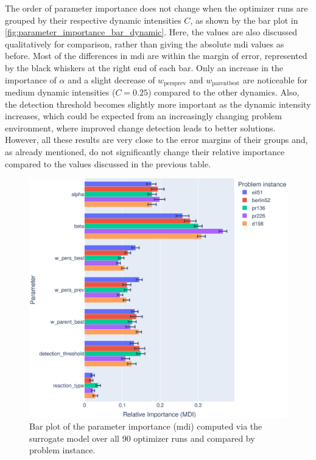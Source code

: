 The order of parameter importance does not change when the optimizer runs are grouped by their respective dynamic intensities $C$, as shown by the bar plot in \cref{fig:parameter_importance_bar_dynamic}. Here, the values are also discussed qualitatively for comparison, rather than giving the absolute \gls{mdi} values as before. Most of the differences in \gls{mdi} are within the margin of error, represented by the black whiskers at the right end of each bar. Only an increase in the importance of $\alpha$ and a slight decrease of $w_{\text{persprev}}$ and $w_{\text{parentbest}}$ are noticeable for medium dynamic intensities ($C=0.25$) compared to the other dynamics. Also, the detection threshold becomes slightly more important as the dynamic intensity increases, which could be expected from an increasingly changing problem environment, where improved change detection leads to better solutions. However, all these results are very close to the error margins of their groups and, as already mentioned, do not significantly change their relative importance compared to the values discussed in the previous table. 

\begin{figure}[h!]
	\centering
	\includegraphics[width=1\textwidth]{results/part2/parameter_importance_bar_problem.svg}
	\caption[Bar plot of the parameter importance compared by problem instance]{Bar plot of the parameter importance (\gls{mdi}) computed via the surrogate model over all 90 optimizer runs and compared by problem instance.}
	\label{fig:parameter_importance_bar_problem}
\end{figure}

